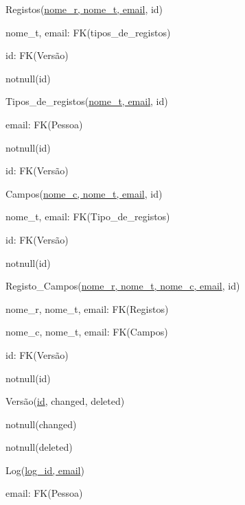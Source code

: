 \documentclass[11pt,a4paper]{article}
\begin{document}
\begin{description}[noitemsep]
	\item Registos(\underline{nome\_r, nome\_t, email}, id)
	\item nome\_t, email: FK(tipos\_de\_registos)
	\item id: FK(Vers\~{a}o)
	\item notnull(id)
\end{description}

\begin{description}[noitemsep]
	\item Tipos\_de\_registos(\underline{nome\_t, email}, id)
	\item email: FK(Pessoa)
	\item notnull(id)
	\item id: FK(Vers\~{a}o)
\end{description}
\newpage

\begin{description}[noitemsep]
	\item Campos(\underline{nome\_c, nome\_t, email}, id)
	\item nome\_t, email: FK(Tipo\_de\_registos)
	\item id: FK(Vers\~{a}o)
	\item notnull(id)
\end{description}

\begin{description}[noitemsep]
	\item Registo\_Campos(\underline{nome\_r, nome\_t, nome\_c, email}, id)
	\item nome\_r, nome\_t, email: FK(Registos)
	\item nome\_c, nome\_t, email: FK(Campos)
	\item id: FK(Vers\~{a}o)
	\item notnull(id)
\end{description}


\begin{description}[noitemsep]
	\item Vers\~{a}o(\underline{id}, changed, deleted)
	\item notnull(changed)
	\item notnull(deleted)
\end{description}

\begin{description}[noitemsep]
	\item Log(\underline{log\_id, email})
	\item email: FK(Pessoa)
\end{description}
\end{document}
